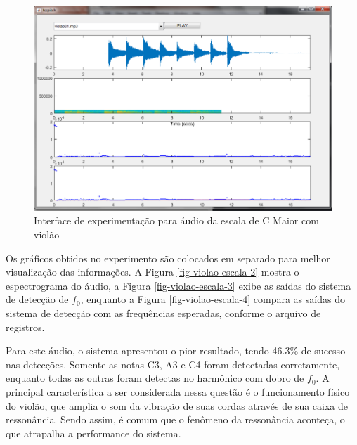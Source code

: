 \begin{figure}
	\centering
	\includegraphics[width=0.75\linewidth]{pasta1_figuras/violao-escala.png}
	\caption{Interface de experimentação para áudio da escala de C Maior com violão}
	\label{fig-violao-escala}
\end{figure}

Os gráficos obtidos no experimento são colocados em separado para melhor visualização das informações. A Figura \ref{fig-violao-escala-2} mostra o espectrograma do áudio, a Figura \ref{fig-violao-escala-3} exibe as saídas do sistema de detecção de $f_0$, enquanto a Figura \ref{fig-violao-escala-4} compara as saídas do sistema de detecção com as frequências esperadas, conforme o arquivo de registros.


Para este áudio, o sistema apresentou o pior resultado, tendo 46.3\% de sucesso nas detecções. Somente as notas C3, A3 e C4 foram detectadas corretamente, enquanto todas as outras foram detectas no harmônico com dobro de $f_0$. A principal característica a ser considerada nessa questão é o funcionamento físico do violão, que amplia o som da vibração de suas cordas através de sua caixa de ressonância. Sendo assim, é comum que o fenômeno da ressonância aconteça, o que atrapalha a performance do sistema. 

